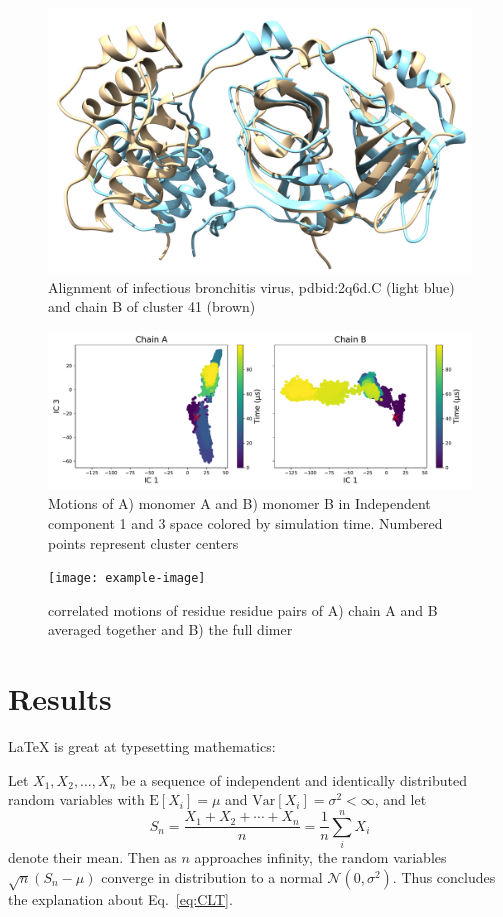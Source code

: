 \documentclass{biophys-new}
\begin{document}
\begin{figure}[h]
\centering
\graphicspath{ {./images/} }
\includegraphics[width=0.6\linewidth]{blue-2Q6D-C-brown-cluster-41-better-align-2.png}
\caption{Alignment of infectious bronchitis virus, pdbid:2q6d.C (light blue) and chain B of cluster 41 (brown)}
\label{fig:view}
\end{figure}

\begin{figure}[h]
\centering
\graphicspath{ {./figures/} }
\includegraphics[width=0.6\linewidth]{fig_4_fdiscolortime_ic3.pdf}
\caption{Motions of A) monomer A and B) monomer B in Independent component 1 and 3 space colored by simulation time. Numbered points represent cluster centers}
\label{fig:view}
\end{figure}

\begin{figure}[h]
\centering
\texttt{[image: example-image]}
\caption{correlated motions of residue residue pairs of A) chain A and B averaged together and B) the full dimer }
\label{fig:view}
\end{figure}

\section*{Results}

\LaTeX{} is great at typesetting mathematics:

Let $X_1, X_2, \ldots, X_n$ be a sequence of independent and identically distributed random variables with $\text{E}[X_i] = \mu$ and $\text{Var}[X_i] = \sigma^2 < \infty$, and let
\begin{equation}
\label{eq:CLT}
S_n = \frac{X_1 + X_2 + \cdots + X_n}{n}
      = \frac{1}{n}\sum_{i}^{n} X_i
\end{equation}
denote their mean. Then as $n$ approaches infinity, the random variables $\sqrt{n}(S_n - \mu)$ converge in distribution to a normal $\mathcal{N}(0, \sigma^2)$. Thus concludes the explanation about Eq.~\ref{eq:CLT}.
\end{document}
